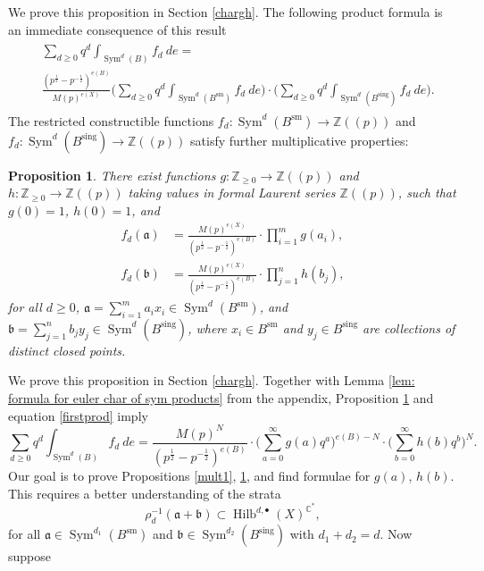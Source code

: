 \documentclass{amsart}
\newtheorem{proposition}[theorem]{Proposition}
\theoremstyle{definition}
\newcommand{\CC} {\mathbb{C}}          %
\newcommand{\ZZ} {\mathbb{Z}}		%
\newcommand{\Sym}{\operatorname{Sym}}
\newcommand{\Hilb}{\operatorname{Hilb}}
\newcommand{\sm}{\operatorname{sm}}
\newcommand{\sing}{\operatorname{sing}}
\begin{document}
We prove this proposition in Section \ref{chargh}. The following product formula is an immediate consequence of this result
\begin{align}
\begin{split} \label{firstprod}
&\sum_{d \geq 0} q^d \int_{\Sym^d(B)} f_d \ de = \\
&\frac{(p^{\frac{1}{2}} - p^{-\frac{1}{2}})^{e(B)}}{M(p)^{e(X)}}  \Bigg( \sum_{d \geq 0} q^d \int_{\Sym^d(B^{\sm})} f_d \ de \Bigg) \cdot \Bigg( \sum_{d \geq 0} q^d \int_{\Sym^d(B^{\sing})} f_d \ de \Bigg). 
\end{split}
\end{align}
The restricted constructible functions $f_d  : \Sym^d(B^{\sm}) \rightarrow \ZZ(\!(p)\!)$ and $f_d  : \Sym^d(B^{\sing}) \rightarrow \ZZ(\!(p)\!)$ satisfy further multiplicative properties:
\begin{proposition} \label{mult2}
There exist functions $g : \ZZ_{\geq 0} \rightarrow \ZZ(\!(p)\!)$ and $h : \ZZ_{\geq 0} \rightarrow \ZZ(\!(p)\!)$ taking values in formal Laurent series $\ZZ(\!(p)\!)$, such that $g(0)=1$, $h(0)=1$, and
\begin{align*}
f_{d}(\mathfrak{a}) &= \frac{M(p)^{e(X)}}{(p^{\frac{1}{2}} - p^{-\frac{1}{2}})^{e(B)}} \cdot \prod_{i=1}^m g(a_i), \\
f_{d}(\mathfrak{b}) &= \frac{M(p)^{e(X)}}{(p^{\frac{1}{2}} - p^{-\frac{1}{2}})^{e(B)}} \cdot \prod_{j=1}^n h(b_j), 
\end{align*}
for all $d \geq 0$, $\mathfrak{a} = \sum_{i=1}^m a_i x_i \in \Sym^{d}(B^{\sm})$, and $\mathfrak{b} = \sum_{j=1}^n b_j y_j \in \Sym^{d}(B^{\sing})$, where $x_i \in B^{\sm}$ and $y_j \in B^{\sing}$ are collections of distinct closed points.
\end{proposition}
We prove this proposition in Section \ref{chargh}. Together with Lemma \ref{lem: formula for euler char of sym products} from the appendix, Proposition \ref{mult2} and equation \eqref{firstprod} imply
\begin{equation} \label{initialprod}
\sum_{d \geq 0} q^d \int_{\Sym^d(B)} f_d \ de = \frac{M(p)^{N}}{(p^{\frac{1}{2}} - p^{-\frac{1}{2}})^{e(B)}} \cdot \Bigg( \sum_{a=0}^{\infty} g(a) q^a \Bigg)^{e(B) - N} \cdot \Bigg( \sum_{b=0}^{\infty} h(b) q^b \Bigg)^N.
\end{equation}
Our goal is to prove Propositions \ref{mult1}, \ref{mult2}, and find formulae for $g(a)$, $h(b)$. This requires a better understanding of the strata
$$
\rho_{d}^{-1} (\mathfrak{a} + \mathfrak{b}) \subset \Hilb^{d, \bullet}(X)^{\CC^*},
$$
for all $\mathfrak{a} \in \Sym^{d_1}(B^{\sm})$ and $\mathfrak{b} \in \Sym^{d_2}(B^{\sing})$ with $d_1+d_2=d$. Now suppose 
\end{document}
